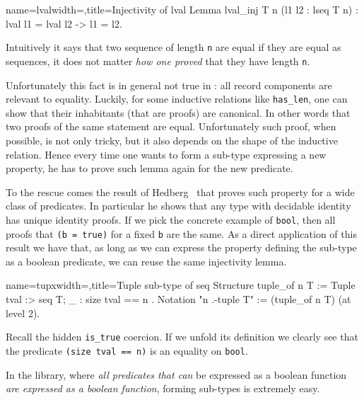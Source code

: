 \begin{coq}{name=lval}{width=\textwidth,title=Injectivity of lval}
Lemma lval_inj T n (l1 l2 : lseq T n) : lval l1 = lval l2 -> l1 = l2.
\end{coq}

Intuitively it says that two sequence of length \lstinline/n/ are
equal if they are equal as sequences, it does not matter \emph{how one
proved} that they have length \lstinline/n/.

Unfortunately this fact is in general not true in \mcbCIC{}: all
record components are relevant to equality.
Luckily, for some inductive relations like \lstinline/has_len/, one
can show that their inhabitants (that are proofs) are canonical.  In
other words that two proofs of the same statement are equal.
Unfortunately such proof, when possible, is not only tricky, but
it also depends on the shape of the inductive relation.  Hence every
time one wants to form a sub-type expressing a new property, he has to
prove such lemma again for the new predicate.

To the rescue comes the result of Hedberg~\cite{Hedberg}
that proves such property for a wide class of predicates.
In particular he shows that any type with decidable identity
has unique identity proofs.  If we pick the concrete example
of \lstinline/bool/, then all proofs that \lstinline/(b = true)/
for a fixed \lstinline/b/ are the same.
As a direct application of this result we have that, as long as we can
express the property defining the sub-type as a boolean predicate,
we can reuse the same injectivity lemma.

\begin{coq}{name=tupx}{width=\textwidth,title=Tuple sub-type of seq}
Structure tuple_of n T :=  Tuple { tval :> seq T; _ : size tval == n }.
Notation "n .-tuple T" := (tuple_of n T) (at level 2).
\end{coq}

Recall the hidden \lstinline/is_true/ coercion.  If we unfold
its definition we clearly see that the predicate
\lstinline/(size tval == n)/ is an equality on \lstinline/bool/.

In the \mcbMC{} library, where \emph{all predicates that can} be
expressed as a boolean function \emph{are expressed as a boolean
function}, forming sub-types is extremely easy.

%

